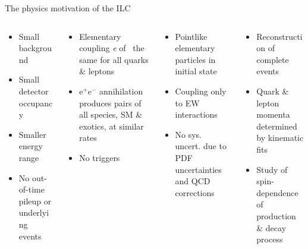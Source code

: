 \documentclass[xcolor={dvipsnames}]{beamer}
\begin{document}
\begin{frame}[fragile]{The physics motivation of the ILC}
{\begin{overprint}
\begin{columns}
\begin{column}{0.24\textwidth}
\begin{itemize}
\color{JungleGreen}
\item Small background
\item Small detector occupancy
\item Smaller energy range
\item No out-of-time pileup or underlying events
\end{itemize}
\end{column}
\begin{column}{0.26\textwidth}
\begin{itemize}
\color{WildStrawberry}
\item Elementary coupling \textit{e} of \textgamma \, the same for all quarks \& leptons
\item e$^+$e$^-$ annihilation produces pairs of all species, SM \& exotics, at similar rates
\item No triggers
\end{itemize}
\end{column}
\begin{column}{0.27\textwidth}
\begin{itemize}
\color{Periwinkle}
\item Pointlike elementary particles in initial state
\item Coupling only to EW interactions
\item No sys. uncert. due to PDF uncertainties and QCD corrections
\end{itemize}
\end{column}
\begin{column}{0.27\textwidth}
\begin{itemize}
\color{LimeGreen}
\item Reconstruction of complete events
\item Quark \& lepton momenta determined by kinematic fits
\item Study of spin-dependence of production \& decay process
\end{itemize}
\end{column}
\end{columns}
\end{overprint}
}%
\end{frame}
\end{document}
